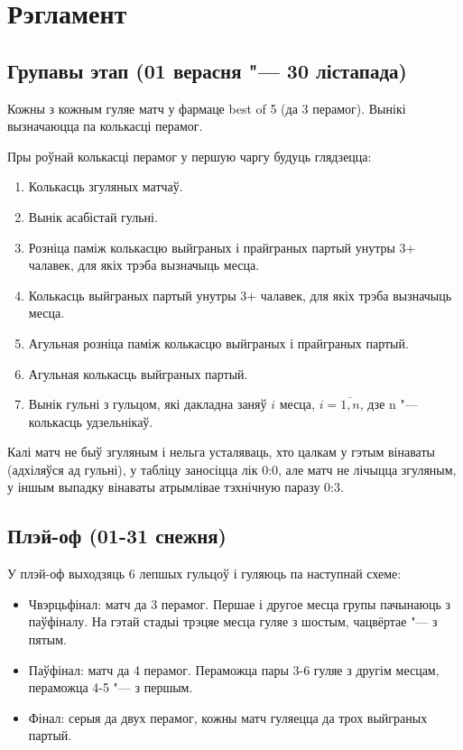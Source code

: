 \documentclass[12pt, a4paper]{extarticle}
\begin{document}
    \section{Рэгламент}
    
    \subsection{Групавы этап (01 верасня "--- 30 лістапада)}

    Кожны з кожным гуляе матч у фармаце best of 5 (да 3 перамог). Вынікі вызначаюцца па колькасці перамог. 
    
    Пры роўнай колькасці перамог у першую чаргу будуць глядзецца:
    \begin{enumerate}
        \item Колькасць згуляных матчаў.
        \item Вынік асабістай гульні.
        \item Розніца паміж колькасцю выйграных і прайграных партый унутры 3+ чалавек, для якіх трэба вызначыць месца.
        \item Колькасць выйграных партый унутры 3+ чалавек, для якіх трэба вызначыць месца.
        \item Агульная розніца паміж колькасцю выйграных і прайграных партый.
        \item Агульная колькасць выйграных партый.
        \item Вынік гульні з гульцом, які дакладна заняў $i$ месца, $i = \overline{1, n}$, дзе n "--- колькасць удзельнікаў.
    \end{enumerate}
    
    Калі матч не быў згуляным і нельга усталяваць, хто цалкам у гэтым вінаваты (адхіляўся ад гульні), у табліцу заносіцца лік 0:0, але матч не лічыцца згуляным, у іншым выпадку вінаваты атрымлівае тэхнічную паразу 0:3.
    
    \subsection{Плэй-оф (01-31 снежня)}
    
    У плэй-оф выходзяць 6 лепшых гульцоў і гуляюць па наступнай схеме:
    
    \begin{itemize}
        \item Чвэрцьфінал: матч да 3 перамог. Першае і другое месца групы пачынаюць з паўфіналу. 
        На гэтай стадыі трэцяе месца гуляе з шостым, чацвёртае "--- з пятым.
        \item Паўфінал: матч да 4 перамог. Пераможца пары 3-6 гуляе з другім месцам, пераможца 4-5 "--- з першым.
        \item Фінал: серыя да двух перамог, кожны матч гуляецца да трох выйграных партый.
    \end{itemize}
\end{document}
